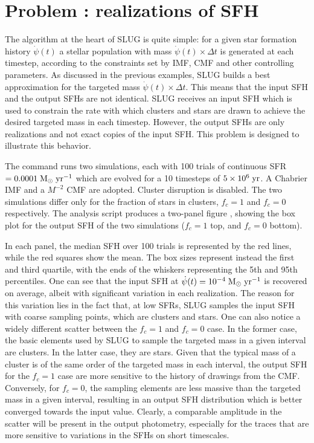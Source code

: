 \documentclass[letterpaper,10pt,english]{sphinxmanual}
\begin{document}
\section{Problem : realizations of SFH}
\label{\detokenize{tests:problem-sfhsampling-realizations-of-sfh}}
The algorithm at the heart of SLUG is quite simple: for a given star formation history
\(\dot\psi(t)\) a stellar population with mass \(\dot\psi(t)\times \Delta t\)
is generated at each timestep, according to the constraints set by IMF, CMF and other
controlling parameters. As discussed in the previous examples, SLUG builds a best
approximation for the targeted mass \(\dot\psi(t)\times \Delta t\). This means that
the input SFH and the output SFHs are not identical. SLUG receives an input SFH which
is used to constrain the rate with which clusters and stars are drawn to achieve the
desired targeted mass in each timestep. However, the output SFHs are only realizations
and not exact copies  of the input SFH. This problem is designed to illustrate this behavior.

The command   runs two  simulations, each with 100 trials
of continuous  SFR \(=0.0001\rm\;M_\odot\;yr^{-1}\) which are evolved for a
10 timesteps of  \(5\times 10^6\rm\;yr\). A Chabrier IMF and a \(M^{-2}\)
CMF are adopted. Cluster disruption is disabled. The two simulations
differ only for the fraction of stars in clusters, \(f_c = 1\) and \(f_c = 0\) respectively.
The analysis script  produces a two-panel figure
, showing the box plot for the output SFH of the two simulations
(\(f_c = 1\) top, and \(f_c = 0\) bottom).

In each panel, the median SFH over 100 trials is represented by the red lines, while the red squares
show the mean. The box sizes represent instead the first and third quartile, with the
ends of the whiskers representing the 5th and 95th percentiles. One can see that the input
SFH at \(\dot\psi(t)=10^{-4}\rm\;M_\odot\;yr^{-1}\) is recovered on average, albeit with
significant variation in each realization. The reason for this variation lies in the fact that,
at low SFRs, SLUG samples the input SFH with coarse sampling points, which are clusters and stars.
One can also notice a widely different scatter between the \(f_c = 1\) and \(f_c = 0\)
case. In the former case, the basic elements used by SLUG to sample the targeted mass in  a
given interval are clusters. In the latter case, they are stars. Given that the typical mass of a
cluster is of the same order of the targeted mass in each interval, the output SFH for
the \(f_c = 1\) case are more sensitive to the history of drawings from the CMF.
Conversely, for  \(f_c = 0\), the sampling elements are less massive than the
targeted mass in a given interval, resulting in an output SFH distribution which is
better converged towards the input value. Clearly, a comparable amplitude in the scatter
will be present in the output photometry, especially for the traces that are more sensitive
to variations in the SFHs on short timescales.
\end{document}
